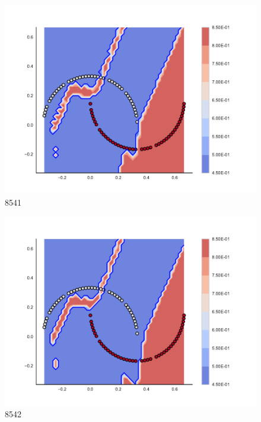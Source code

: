\begin{subfigure}[b]{0.09\textwidth}
    \includegraphics[clip, trim=2.35cm 1.75cm 4.5cm 0cm,width=\textwidth]{img/convergence/8541.pdf}
    \caption{8541}
    \label{fig:convergence_8541}
\end{subfigure}
%
\begin{subfigure}[b]{0.09\textwidth}
    \includegraphics[clip, trim=2.35cm 1.75cm 4.5cm 0cm,width=\textwidth]{img/convergence/8542.pdf}
    \caption{8542}
    \label{fig:convergence_8542}
\end{subfigure}
%
